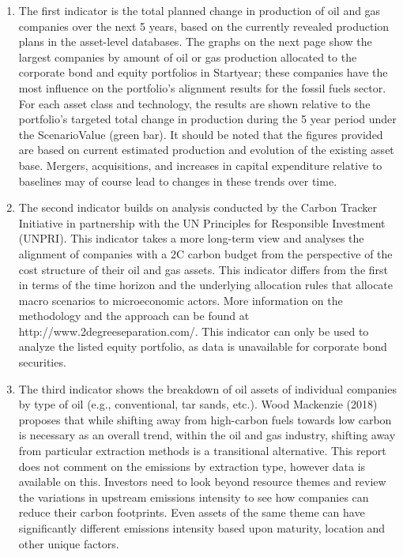 \documentclass[10pt,table,a4]{article}\usepackage[]{graphicx}\usepackage[]{color}
\begin{document}
\begin{multicols}{2}
		\begin{enumerate}
			\item The first indicator is the total planned change in production of oil and gas companies over the next 5 years, based on the currently revealed production plans in the asset-level databases. The graphs on the next page show the largest companies by amount of oil or gas production allocated to the corporate bond and equity portfolios in Startyear; these companies have the most influence on the portfolio's alignment results for the fossil fuels sector. For each asset class and technology, the results are shown relative to the portfolio's targeted total change in production during the 5 year period under the ScenarioValue (green bar). It should be noted that the figures provided are based on current estimated production and evolution of the existing asset base. Mergers, acquisitions, and increases in capital expenditure relative to baselines may of course lead to changes in these trends over time. 
			\item The second indicator builds on analysis conducted by the Carbon Tracker Initiative in partnership with the UN Principles for Responsible Investment (UNPRI). This indicator takes a more long-term view and analyses the alignment of companies with a 2\degree C carbon budget from the perspective of the cost structure of their oil and gas assets. This indicator differs from the first in terms of the time horizon and the underlying allocation rules that allocate macro scenarios to microeconomic actors. More information on the methodology and the approach can be found at http://www.2degreeseparation.com/. This indicator can only be used to analyze the listed equity portfolio, as data is unavailable for corporate bond securities. 
			\item The third indicator shows the breakdown of oil assets of individual companies by type of oil (e.g., conventional, tar sands, etc.). Wood Mackenzie (2018) proposes that while shifting away from high-carbon fuels towards low carbon is necessary as an overall trend, within the oil and gas industry, shifting away from particular extraction methods is a transitional alternative. This report does not comment on the emissions by extraction type, however data is available on this. Investors need to look beyond resource themes and review the variations in upstream emissions intensity to see how companies can reduce their carbon footprints. Even assets of the same theme can have significantly different emissions intensity based upon maturity, location and other unique factors.
		\end{enumerate}
			

\end{multicols}
\end{document}
